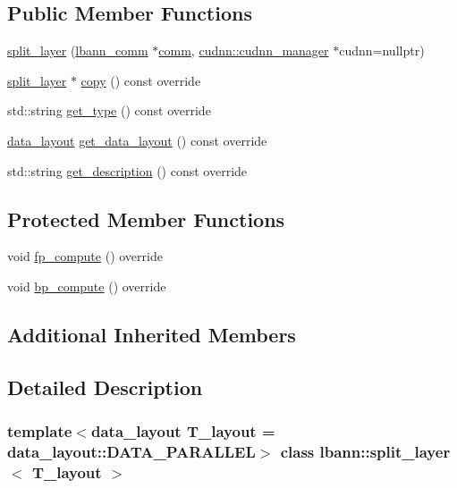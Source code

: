 \subsection*{Public Member Functions}
\begin{DoxyCompactItemize}
\item 
\hyperlink{classlbann_1_1split__layer_a875f1e07dd924826e7ec62e44f697c3e}{split\+\_\+layer} (\hyperlink{classlbann_1_1lbann__comm}{lbann\+\_\+comm} $\ast$\hyperlink{file__io_8cpp_ab048c6f9fcbcfaa57ce68b00263dbebe}{comm}, \hyperlink{classlbann_1_1cudnn_1_1cudnn__manager}{cudnn\+::cudnn\+\_\+manager} $\ast$cudnn=nullptr)
\item 
\hyperlink{classlbann_1_1split__layer}{split\+\_\+layer} $\ast$ \hyperlink{classlbann_1_1split__layer_ae6b974e17e27163c6856b6114b7d6362}{copy} () const override
\item 
std\+::string \hyperlink{classlbann_1_1split__layer_a3c0863c5c28e69f09fa586f8ff57c757}{get\+\_\+type} () const override
\item 
\hyperlink{base_8hpp_a786677cbfb3f5677b4d84f3056eb08db}{data\+\_\+layout} \hyperlink{classlbann_1_1split__layer_ad206038eac236a971664ccacec8faa82}{get\+\_\+data\+\_\+layout} () const override
\item 
std\+::string \hyperlink{classlbann_1_1split__layer_a3e599c39385b1d707ad9f28454f52cf5}{get\+\_\+description} () const override
\end{DoxyCompactItemize}
\subsection*{Protected Member Functions}
\begin{DoxyCompactItemize}
\item 
void \hyperlink{classlbann_1_1split__layer_aeb4caccd2675195ce75ae63485f6d402}{fp\+\_\+compute} () override
\item 
void \hyperlink{classlbann_1_1split__layer_ae7b54dc12b2560d27f506d5f34c4074f}{bp\+\_\+compute} () override
\end{DoxyCompactItemize}
\subsection*{Additional Inherited Members}


\subsection{Detailed Description}
\subsubsection*{template$<$data\+\_\+layout T\+\_\+layout = data\+\_\+layout\+::\+D\+A\+T\+A\+\_\+\+P\+A\+R\+A\+L\+L\+EL$>$\newline
class lbann\+::split\+\_\+layer$<$ T\+\_\+layout $>$}

